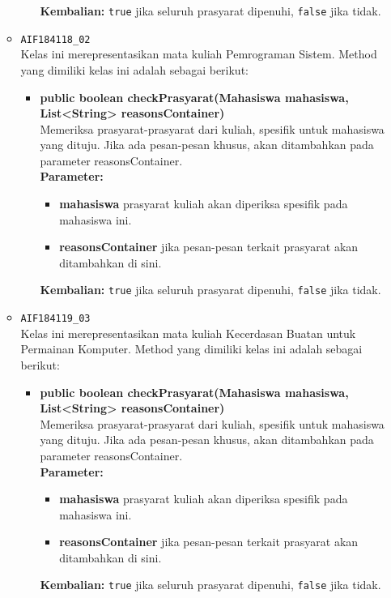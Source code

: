 \begin{enumerate}
\begin{itemize}
\begin{itemize}
\begin{itemize}
			\end{itemize}
			\textbf{Kembalian:} \texttt{true} jika seluruh prasyarat dipenuhi, \texttt{false} jika tidak.
		\end{itemize}
		\item \texttt{AIF184118\_02} \\
		Kelas ini merepresentasikan mata kuliah Pemrograman Sistem. Method yang dimiliki kelas ini adalah sebagai berikut: 
		\begin{itemize}
			\item \textbf{public boolean checkPrasyarat(Mahasiswa mahasiswa, List<String> reasonsContainer)}\\
			Memeriksa prasyarat-prasyarat dari kuliah, spesifik untuk mahasiswa yang dituju. Jika ada pesan-pesan khusus, akan ditambahkan pada parameter reasonsContainer.\\
			\textbf{Parameter:}
			\begin{itemize}
				\item \textbf{mahasiswa} prasyarat kuliah akan diperiksa spesifik pada mahasiswa ini.
				\item \textbf{reasonsContainer} jika pesan-pesan terkait prasyarat akan ditambahkan di sini.
			\end{itemize}
			\textbf{Kembalian:} \texttt{true} jika seluruh prasyarat dipenuhi, \texttt{false} jika tidak.
		\end{itemize}
		\item \texttt{AIF184119\_03} \\
		Kelas ini merepresentasikan mata kuliah Kecerdasan Buatan untuk Permainan Komputer. Method yang dimiliki kelas ini adalah sebagai berikut: 
		\begin{itemize}
			\item \textbf{public boolean checkPrasyarat(Mahasiswa mahasiswa, List<String> reasonsContainer)}\\
			Memeriksa prasyarat-prasyarat dari kuliah, spesifik untuk mahasiswa yang dituju. Jika ada pesan-pesan khusus, akan ditambahkan pada parameter reasonsContainer.\\
			\textbf{Parameter:}
			\begin{itemize}
				\item \textbf{mahasiswa} prasyarat kuliah akan diperiksa spesifik pada mahasiswa ini.
				\item \textbf{reasonsContainer} jika pesan-pesan terkait prasyarat akan ditambahkan di sini.
			\end{itemize}
			\textbf{Kembalian:} \texttt{true} jika seluruh prasyarat dipenuhi, \texttt{false} jika tidak.

\end{itemize}
\end{itemize}
\end{enumerate}
